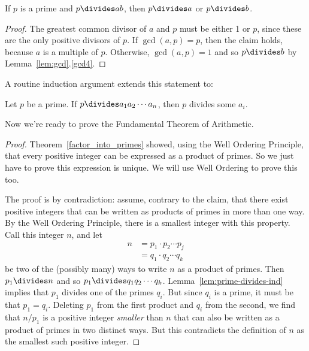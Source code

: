 \begin{lemma}
\label{lem:prime-divides}
If $p$ is a prime and $p \divides ab$, then $p \divides a$ or $p \divides b$.
\end{lemma}

\begin{proof}
The greatest common divisor of $a$ and $p$ must be either 1 or $p$,
since these are the only positive divisors of $p$.  If $\gcd(a, p) = p$, 
then the claim holds, because $a$ is a multiple of $p$.  Otherwise,
$\gcd(a, p) = 1$ and so $p \divides b$ by Lemma~\ref{lem:gcd}.\ref{gcd4}.
\end{proof}

A routine induction argument extends this statement to:

\begin{lemma}
\label{lem:prime-divides-ind}
Let $p$ be a prime.  If $p \divides a_1 a_2 \cdots a_n$, then $p$ divides
some $a_i$.
\end{lemma}

Now we're ready to prove the Fundamental Theorem of Arithmetic.
\begin{proof}
Theorem~\ref{factor_into_primes} showed, using the Well Ordering
Principle, that every positive integer can be expressed as a product
of primes.  So we just have to prove this expression is unique.  We
will use Well Ordering to prove this too.

The proof is by contradiction: assume, contrary to the claim, that there
exist positive integers that can be written as products of primes in more
than one way.  By the Well Ordering Principle, there is a smallest integer
with this property.  Call this integer $n$, and let
%
\begin{align*}
n & = p_1 \cdot p_2 \cdots p_j \\
  & = q_1 \cdot q_2 \cdots q_k
\end{align*}
%
be two of the (possibly many) ways to write $n$ as a product of
primes.  Then $p_1 \divides n$ and so $p_1 \divides q_1 q_2 \cdots q_k$.
Lemma~\ref{lem:prime-divides-ind} implies that $p_1$ divides one of
the primes $q_i$.  But since $q_i$ is a prime, it must be that $p_1 =
q_i$.  Deleting $p_1$ from the first product and $q_i$ from the
second, we find that $n / p_1$ is a positive integer \emph{smaller}
than $n$ that can also be written as a product of primes in two
distinct ways.  But this contradicts the definition of $n$ as the
smallest such positive integer.
\end{proof}

